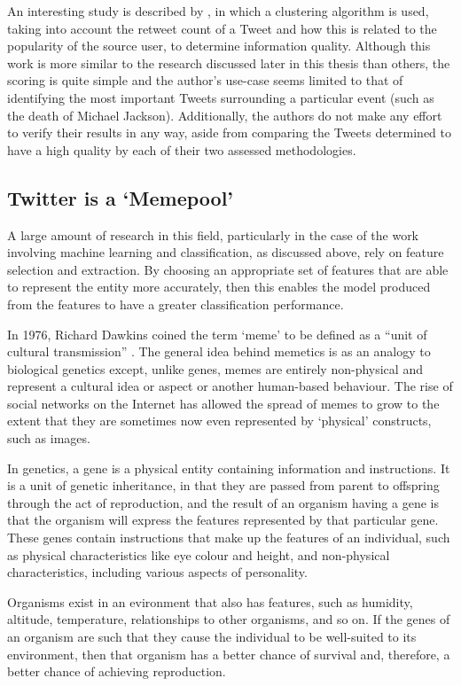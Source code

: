 An interesting study is described by \cite{lauw10}, in which a clustering algorithm is used, taking into account the retweet count of a Tweet and how this is related to the popularity of the source user, to determine information quality. Although this work is more similar to the research discussed later in this thesis than others, the scoring is quite simple and the author's use-case seems limited to that of identifying the most important Tweets surrounding a particular event (such as the death of Michael Jackson). Additionally, the authors do not make any effort to verify their results in any way, aside from comparing the Tweets determined to have a high quality by each of their two assessed methodologies.



\subsection{Twitter is a `Memepool'}
A large amount of research in this field, particularly in the case of the work involving machine learning and classification, as discussed above, rely on feature selection and extraction. By choosing an appropriate set of features that are able to represent the entity more accurately, then this enables the model produced from the features to have a greater classification performance.  

In 1976, Richard Dawkins coined the term `meme' to be defined as a ``unit of cultural transmission'' \cite{dawkins76}. The general idea behind memetics is as an analogy to biological genetics except, unlike genes, memes are entirely non-physical and represent a cultural idea or aspect or another human-based behaviour. The rise of social networks on the Internet has allowed the spread of memes to grow to the extent that they are sometimes now even represented by `physical' constructs, such as images.

In genetics, a gene is a physical entity containing information and instructions. It is a unit of genetic inheritance, in that they are passed from parent to offspring through the act of reproduction, and the result of an organism having a gene is that the organism will express the features represented by that particular gene. These genes contain instructions that make up the features of an individual, such as physical characteristics like eye colour and height, and non-physical characteristics, including various aspects of personality.

Organisms exist in an evironment that also has features, such as humidity, altitude, temperature, relationships to other organisms, and so on. If the genes of an organism are such that they cause the individual to be well-suited to its environment, then that organism has a better chance of survival and, therefore, a better chance of achieving reproduction.

